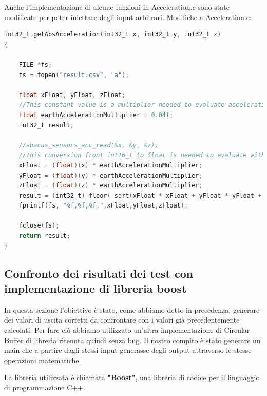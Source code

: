 \documentclass[LaM,binding=0.6cm]{../sapthesis}
\begin{document}
Anche  l'implementazione di alcune funzioni in Acceleration.c sono state modificate per poter iniettare degli input arbitrari.
\newline
Modifiche a Acceleration.c:
\begin{lstlisting}[language=C]
int32_t getAbsAcceleration(int32_t x, int32_t y, int32_t z)
{
    
    FILE *fs;
    fs = fopen("result.csv", "a");

    float xFloat, yFloat, zFloat;   
    //This constant value is a multiplier needed to evaluate acceleration on earth
    float earthAccelerationMultiplier = 0.04f;
    int32_t result;

    //abacus_sensors_acc_read(&x, &y, &z);
    //This conversion front int16_t to float is needed to evaluate with more precision the absolute value of acceleration
    xFloat = (float)(x) * earthAccelerationMultiplier;
    yFloat = (float)(y) * earthAccelerationMultiplier;
    zFloat = (float)(z) * earthAccelerationMultiplier;
    result = (int32_t) floor( sqrt(xFloat * xFloat + yFloat * yFloat + zFloat * zFloat ) ) ;
    fprintf(fs, "%f,%f,%f,",xFloat,yFloat,zFloat);

    fclose(fs);
    return result;
}
\end{lstlisting}

\subsection{Confronto dei risultati dei test con implementazione di libreria boost}

In questa sezione l'obiettivo è stato, come abbiamo detto in precedenza, generare dei valori di uscita corretti da confrontare con i valori già precedentemente calcolati.
Per fare ciò abbiamo utilizzato un'altra implementazione di Circular Buffer di libreria ritenuta quindi senza bug. Il nostro compito è stato generare un main che a partire dagli stessi input generasse degli output attraverso le stesse operazioni matematiche.

La libreria utilizzata è chiamata \textbf{"Boost"}, una libreria di codice per il linguaggio di programmazione C++.
\end{document}
